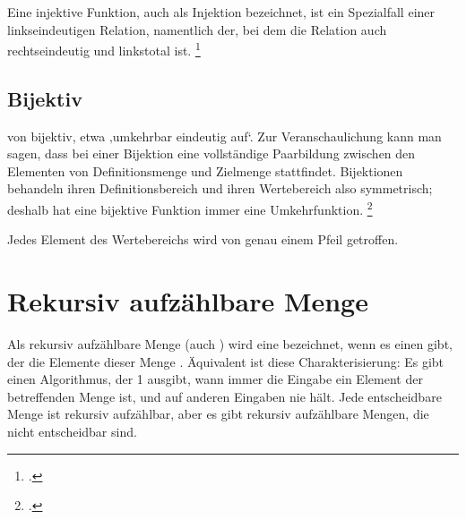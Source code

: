 \documentclass{lehramt-informatik-haupt}
\begin{document}
Eine injektive Funktion, auch als Injektion bezeichnet, ist ein
Spezialfall einer linkseindeutigen Relation, namentlich der, bei dem die
Relation auch rechtseindeutig und linkstotal ist.
\footcite{wiki:injektiv}

%

\subsection{Bijektiv}

von bijektiv, etwa ‚umkehrbar eindeutig auf‘. Zur Veranschaulichung kann
man sagen, dass bei einer Bijektion eine vollständige Paarbildung
zwischen den Elementen von Definitionsmenge und Zielmenge stattfindet.
Bijektionen behandeln ihren Definitionsbereich und ihren Wertebereich
also symmetrisch; deshalb hat eine bijektive Funktion immer eine
Umkehrfunktion.
\footcite{wiki:bijektiv}

Jedes Element des Wertebereichs wird von genau einem Pfeil getroffen.

\begin{center}
\end{center}

\section{Rekursiv aufzählbare Menge}

Als rekursiv aufzählbare Menge (auch )
wird eine  bezeichnet, wenn es einen
 gibt, der die Elemente dieser Menge
. Äquivalent ist diese Charakterisierung: Es gibt einen
Algorithmus, der 1 ausgibt, wann immer die Eingabe ein Element der
betreffenden Menge ist, und auf anderen Eingaben nie hält. Jede
entscheidbare Menge ist rekursiv aufzählbar, aber es gibt rekursiv
aufzählbare Mengen, die nicht entscheidbar sind.
\end{document}

